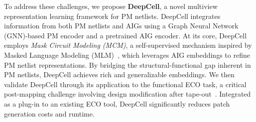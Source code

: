 To address these challenges, we propose \textbf{DeepCell}, a novel multiview representation learning framework for PM netlists. DeepCell integrates information from both PM netlists and AIGs using a Graph Neural Network (GNN)-based PM encoder and a pretrained AIG encoder. At its core, DeepCell employs \emph{Mask Circuit Modeling (MCM)}, a self-supervised mechanism inspired by Masked Language Modeling (MLM)~\cite{devlin2018bert}, which leverages AIG embeddings to refine PM netlist representations. By bridging the structural-functional gap inherent in PM netlists, DeepCell achieves rich and generalizable embeddings. We then validate DeepCell through its application to the functional ECO task, a critical post-mapping challenge involving design modification after tape-out~\cite{huang2013match}. Integrated as a plug-in to an existing ECO tool, DeepCell significantly reduces patch generation costs and runtime. 






